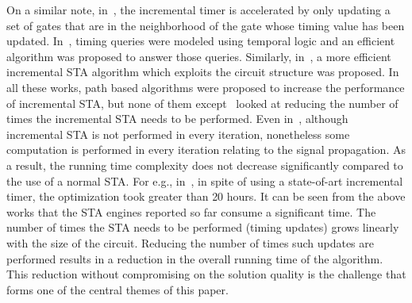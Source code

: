 On a similar note, in~\cite{coudert:97}, the incremental timer is accelerated by only updating a 
set of gates that are in the neighborhood of the gate whose timing value has been updated. 
In~\cite{mondal:04}, timing queries were modeled using temporal logic and an efficient 
algorithm was proposed to answer those queries. Similarly, in~\cite{das:06}, a more 
efficient incremental STA algorithm which exploits the circuit structure was proposed. 
In all these works, path based algorithms were proposed to 
increase the performance of incremental STA, but none of them except~\cite{abato:96} looked 
at reducing the number of times the incremental STA needs to be performed. 
Even in~\cite{abato:96}, although incremental STA is not performed in every iteration, 
nonetheless some computation is performed in every iteration relating to the signal propagation. 
As a result, the running time complexity does not decrease significantly compared to the use of a normal STA. 
For e.g., in~\cite{hu:12}, in spite of using a state-of-art incremental timer, the optimization 
took greater than 20 hours. It can be seen from the above works that the STA engines reported so far consume a significant time. The number of times the STA needs to be performed (timing updates) grows linearly with the size of the circuit. Reducing the number of times such updates are performed results in a reduction in the overall running time of the algorithm. This reduction without compromising on the solution quality is the challenge that forms one of the central themes of this paper.



